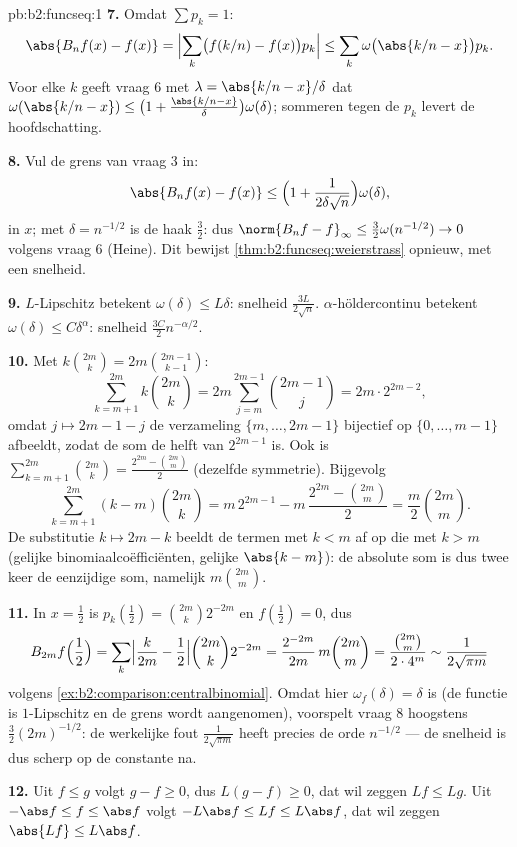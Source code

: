 \begin{solution}{pb:b2:funcseq:1}
\textbf{7.} Omdat $\sum p_k = 1$:
\[
\abs{B_nf(x) - f(x)}
= \Bigl|\sum_k\bigl(f(k/n) - f(x)\bigr)p_k\Bigr|
\leq \sum_k\omega\bigl(\abs{k/n - x}\bigr)p_k .
\]
Voor elke $k$ geeft vraag 6 met $\lambda = \abs{k/n - x}/\delta$
dat $\omega(\abs{k/n-x}) \leq \bigl(1 +
\frac{\abs{k/n-x}}\delta\bigr)\omega(\delta)$; sommeren tegen de
$p_k$ levert de hoofdschatting.

\textbf{8.} Vul de grens van vraag 3 in:
\[
\abs{B_nf(x) - f(x)} \leq \Bigl(1 +
\frac{1}{2\delta\sqrt n}\Bigr)\omega(\delta),
\]
 in $x$; met $\delta = n^{-1/2}$ is de haak $\frac32$: dus
$\norm{B_nf - f}_\infty \leq \frac32\omega(n^{-1/2}) \to 0$ volgens
vraag 6 (Heine). Dit bewijst
\cref{thm:b2:funcseq:weierstrass} opnieuw, met een snelheid.

\textbf{9.} $L$-Lipschitz betekent $\omega(\delta) \leq L\delta$:
snelheid $\frac{3L}{2\sqrt n}$. $\alpha$-höldercontinu betekent
$\omega(\delta) \leq C\delta^\alpha$: snelheid $\frac{3C}{2}
n^{-\alpha/2}$.

\textbf{10.} Met $k\binom{2m}k = 2m\binom{2m-1}{k-1}$:
\[
\sum_{k=m+1}^{2m}k\binom{2m}k
= 2m\sum_{j=m}^{2m-1}\binom{2m-1}{j}
= 2m\cdot 2^{2m-2},
\]
omdat $j \mapsto 2m-1-j$ de verzameling $\{m,\dots,2m-1\}$
bijectief op $\{0,\dots,m-1\}$ afbeeldt, zodat de som de helft van
$2^{2m-1}$ is. Ook is $\sum_{k=m+1}^{2m}\binom{2m}k = \frac{2^{2m}
- \binom{2m}m}{2}$ (dezelfde symmetrie). Bijgevolg
\[
\sum_{k=m+1}^{2m}(k-m)\binom{2m}k
= m\,2^{2m-1} - m\,\frac{2^{2m} - \binom{2m}m}{2}
= \frac m2\binom{2m}m .
\]
De substitutie $k \mapsto 2m-k$ beeldt de termen met $k < m$ af op
die met $k > m$ (gelijke binomiaalcoëfficiënten, gelijke
$\abs{k-m}$): de absolute som is dus twee keer de eenzijdige som,
namelijk $m\binom{2m}m$.

\textbf{11.} In $x = \frac12$ is $p_k(\tfrac12) =
\binom{2m}k2^{-2m}$ en $f(\tfrac12) = 0$, dus
\[
B_{2m}f\Bigl(\frac12\Bigr)
= \sum_k\Bigl|\frac{k}{2m} - \frac12\Bigr|
\binom{2m}k 2^{-2m}
= \frac{2^{-2m}}{2m}\,m\binom{2m}m
= \frac{\binom{2m}m}{2\cdot4^m}
\sim \frac{1}{2\sqrt{\pi m}}
\]
volgens \cref{ex:b2:comparison:centralbinomial}. Omdat hier
$\omega_f(\delta) = \delta$ is (de functie is $1$-Lipschitz en de
grens wordt aangenomen), voorspelt vraag 8 hoogstens
$\frac32(2m)^{-1/2}$: de werkelijke fout $\frac{1}{2\sqrt{\pi m}}$
heeft precies de orde $n^{-1/2}$ --- de snelheid is dus scherp op
de constante na.

\textbf{12.} Uit $f \leq g$ volgt $g - f \geq 0$, dus $L(g-f) \geq
0$, dat wil zeggen $Lf \leq Lg$. Uit $-\abs f \leq f \leq \abs f$
volgt $-L\abs f \leq Lf \leq L\abs f$, dat wil zeggen $\abs{Lf}
\leq L\abs f$.


\end{solution}
